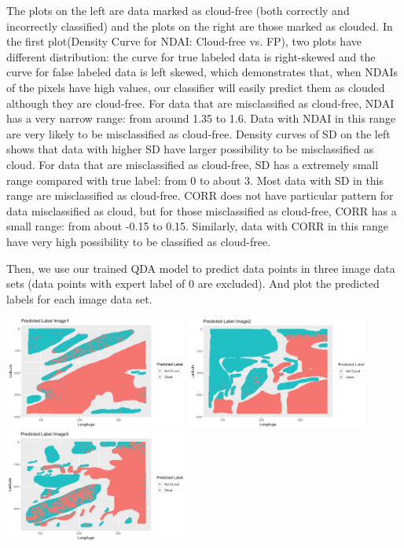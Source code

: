 \documentclass[11pt]{article}
\begin{document}
The plots on the left are data marked as cloud-free (both correctly and incorrectly classified) and the plots on the right are those marked as clouded. In the first plot(Density Curve for NDAI: Cloud-free vs. FP), two plots have different distribution: the curve for true labeled data is right-skewed and the curve for false labeled data is left skewed, which demonstrates that, when NDAIs of the pixels have high values, our classifier will easily predict them as clouded although they are cloud-free. For data that are misclassified as cloud-free, NDAI has a very narrow range: from around 1.35 to 1.6. Data with NDAI in this range are very likely to be misclassified as cloud-free. Density curves of SD on the left shows that data with higher SD have larger possibility to be misclassified as cloud. For data that are misclassified as cloud-free, SD has a extremely small range compared with true label: from 0 to about 3. Most data with SD in this range are misclassified as cloud-free. CORR does not have particular pattern for data misclassified as cloud, but for those misclassified as cloud-free, CORR has a small range: from about -0.15 to 0.15. Similarly, data with CORR in this range have very high possibility to be classified as cloud-free.

Then, we use our trained QDA model to predict data points in three image data sets (data points with expert label of 0 are excluded). And plot the predicted labels for each image data set.

\includegraphics[width = 6cm]{4(b)7}
\includegraphics[width = 6cm]{4(b)8}
\includegraphics[width = 6cm]{4(b)9}
\end{document}
